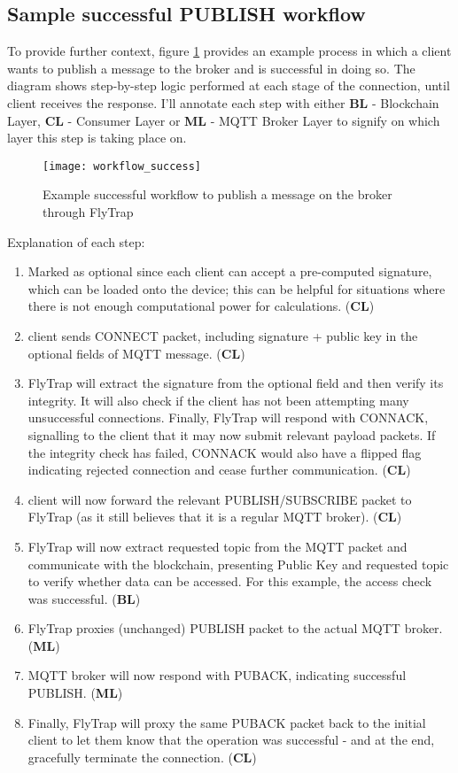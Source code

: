 \subsection{Sample successful PUBLISH workflow}
To provide further context, figure \ref{fig:workflow_success} provides an example process in which a client wants to publish a message to the broker and is successful in doing so. The diagram shows step-by-step logic performed at each stage of the connection, until client receives the response. I'll annotate each step with either \textbf{BL} - Blockchain Layer, \textbf{CL} - Consumer Layer or \textbf{ML} - MQTT Broker Layer to signify on which layer this step is taking place on.
\begin{figure}[h]
    \centering
    \texttt{[image: workflow\_success]}
    \caption{Example successful workflow to publish a message on the broker through FlyTrap}
    \label{fig:workflow_success}
\end{figure}

Explanation of each step:
\begin{enumerate}\addtocounter{enumi}{-1}
    \item Marked as optional since each client can accept a pre-computed signature, which can be loaded onto the device; this can be helpful for situations where there is not enough computational power for calculations. (\textbf{CL})
    \item client sends CONNECT packet, including signature + public key in the optional fields of MQTT message. (\textbf{CL})
    \item FlyTrap will extract the signature from the optional field and then verify its integrity. It will also check if the client has not been attempting many unsuccessful connections. Finally, FlyTrap will respond with CONNACK, signalling to the client that it may now submit relevant payload packets. If the integrity check has failed, CONNACK would also have a flipped flag indicating rejected connection and cease further communication. (\textbf{CL})
    \item client will now forward the relevant PUBLISH/SUBSCRIBE packet to FlyTrap (as it still believes that it is a regular MQTT broker). (\textbf{CL})
    \item FlyTrap will now extract requested topic from the MQTT packet and communicate with the blockchain, presenting Public Key and requested topic to verify whether data can be accessed. For this example, the access check was successful. (\textbf{BL})
    \item FlyTrap proxies (unchanged) PUBLISH packet to the actual MQTT broker. (\textbf{ML})
    \item MQTT broker will now respond with PUBACK, indicating successful PUBLISH. (\textbf{ML})
    \item Finally, FlyTrap will proxy the same PUBACK packet back to the initial client to let them know that the operation was successful - and at the end, gracefully terminate the connection. (\textbf{CL})
\end{enumerate}

